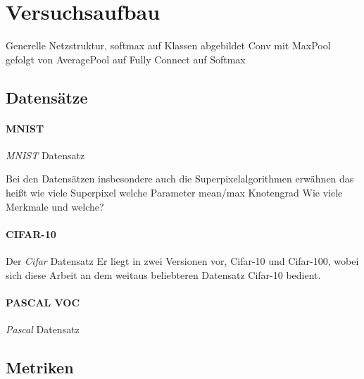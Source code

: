 \section{Versuchsaufbau}
\label{versuchsaufbau}

Generelle Netzstruktur, softmax auf Klassen abgebildet
Conv mit MaxPool gefolgt von AveragePool auf Fully Connect auf Softmax

\subsection{Datensätze}
\label{datensaetze}

\paragraph{MNIST}
\label{mnist}

\emph{\gls{MNIST}} Datensatz

Bei den Datensätzen insbesondere auch die Superpixelalgorithmen erwähnen
das heißt wie viele Superpixel
welche Parameter
mean/max Knotengrad
Wie viele Merkmale und welche?

\cite{mnist}



\paragraph{CIFAR-10}
\label{cifar_10}

\cite{cifar_10}

Der \emph{\gls{Cifar}} Datensatz
Er liegt in zwei Versionen vor, \gls{Cifar}-10 und \gls{Cifar}-100, wobei sich diese Arbeit an dem weitaus beliebteren Datensatz \gls{Cifar}-10 bedient.





\paragraph{PASCAL VOC}
\label{pascal_voc}

\emph{\gls{Pascal}} Datensatz
\cite{pascal_voc}



\subsection{Metriken}
\label{metriken}

